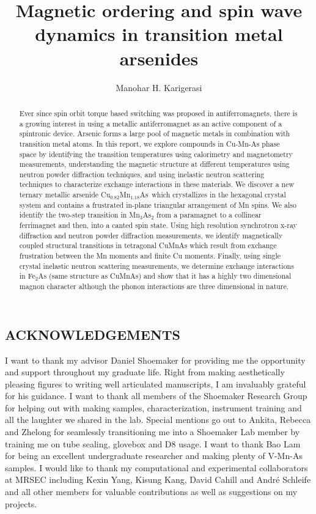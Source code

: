 \documentclass[letterpaper,10pt,doublespacing,edeposit]{uiucthesis2020}
\title{Magnetic ordering and spin wave dynamics in transition metal arsenides}
\author{Manohar H. Karigerasi}
\newcommand*{\cumnas}{Cu$_{0.82}$Mn$_{1.18}$As}
\begin{document}
\maketitle


\begin{frontmatter}

\begin{abstract}
Ever since spin orbit torque based switching was proposed in antiferromagnets, there is a growing interest in using a metallic antiferromagnet as an active component of a spintronic device. Arsenic forms a large pool of magnetic metals in combination with transition metal atoms. In this report, we explore compounds in Cu-Mn-As phase space by identifying the transition temperatures using calorimetry and magnetometry measurements, understanding the magnetic structure at different temperatures using neutron powder diffraction techniques, and using inelastic neutron scattering techniques to characterize exchange interactions in these materials. We discover a new ternary metallic arsenide \cumnas\ which crystallizes in the hexagonal crystal system and contains a frustrated in-plane triangular arrangement of Mn spins. We also identify the two-step transition in Mn$_3$As$_2$ from a paramagnet to a collinear ferrimagnet and then, into a canted spin state. Using high resolution synchrotron x-ray diffraction and neutron powder diffraction measurements, we identify magnetically coupled structural transitions in tetragonal CuMnAs which result from exchange frustration between the Mn moments and finite Cu moments. Finally, using single crystal inelastic neutron scattering measurements, we determine exchange interactions in Fe$_2$As (same structure as CuMnAs) and show that it has a highly two dimensional magnon character although the phonon interactions are three dimensional in nature.
\end{abstract}

\chapter*{\hfill ACKNOWLEDGEMENTS \hfill}

I want to thank my advisor Daniel Shoemaker for providing me the opportunity and support throughout my graduate life. Right from making aesthetically pleasing figures to writing well articulated manuscripts, I am invaluably grateful for his guidance. I want to thank all members of the Shoemaker Research Group for helping out with making samples, characterization, instrument training and all the laughter we shared in the lab. Special mentions go out to Ankita, Rebecca and Zhelong for seamlessly transitioning me into a Shoemaker Lab member by training me on tube sealing, glovebox and D8 usage. I want to thank Bao Lam for being an excellent undergraduate researcher and making plenty of V-Mn-As samples. I would like to thank my computational and experimental collaborators at MRSEC including Kexin Yang, Kisung Kang, David Cahill and Andr\'e Schleife and all other members for valuable contributions as well as suggestions on my projects. 


\end{frontmatter}
\end{document}
